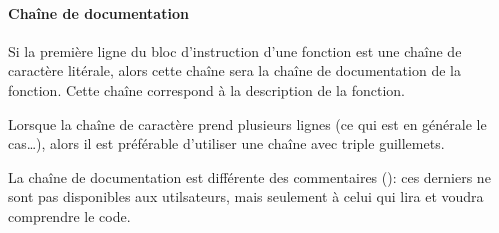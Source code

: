 \documentclass[letterpaper,10pt,english]{sphinxhowto}
\begin{document}
\paragraph{Chaîne de documentation}
\label{\detokenize{cours1_fonctions_cours:chaine-de-documentation}}
\sphinxAtStartPar
Si la première ligne du bloc d’instruction d’une fonction est une chaîne de caractère litérale, alors cette chaîne sera la chaîne de documentation de la fonction. Cette chaîne correspond à la description de la fonction.

\begin{sphinxVerbatim}[commandchars=\\\{\}]
 
     

\end{sphinxVerbatim}

\sphinxAtStartPar
Lorsque la chaîne de caractère prend plusieurs lignes (ce qui est en générale le cas…), alors il est préférable d’utiliser une chaîne avec triple guillemets.

\begin{sphinxVerbatim}[commandchars=\\\{\}]
 
     

\end{sphinxVerbatim}

\sphinxAtStartPar
La chaîne de documentation est différente des commentaires (\sphinxcode{\sphinxupquote{\#}}): ces derniers ne sont pas disponibles aux utilsateurs, mais seulement à celui qui lira et voudra comprendre le code.
\end{document}
